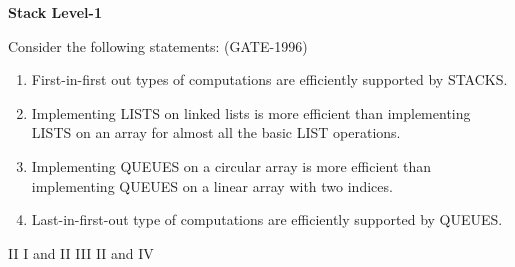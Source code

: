 \centerline{\textbf{ \LARGE Stack Level-1}}

\begin{questyle}
  \question  Consider the following statements:  (GATE-1996)
    \begin{enumerate}
        \item First-in-first out types of computations are efficiently supported by STACKS.
        \item Implementing LISTS on linked lists is more efficient than implementing LISTS on an array for almost all the basic LIST operations.
        \item Implementing QUEUES on a circular array is more efficient than implementing QUEUES on a linear array with two indices.
        \item Last-in-first-out type of computations are efficiently supported by QUEUES.
    \end{enumerate}

  \begin{oneparchoices}
    \choice         II
    \choice         I and II
    \CorrectChoice  III
    \choice         II and IV
  \end{oneparchoices}
\end{questyle}
